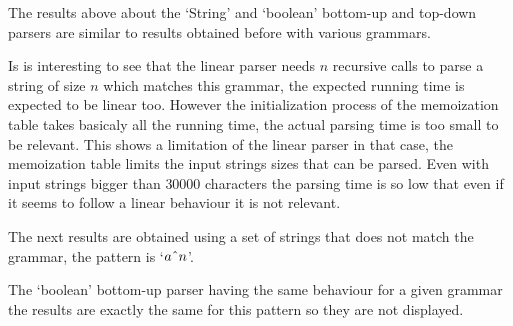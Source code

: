 The results above about the `String' and `boolean' bottom-up and top-down parsers are similar to results obtained before with various grammars.

Is is interesting to see that the linear parser needs $n$ recursive calls to parse a string of size $n$ which matches this grammar, the expected running time is expected to be linear too.
However the initialization process of the memoization table takes basicaly all the running time, the actual parsing time is too small to be relevant.
This shows a limitation of the linear parser in that case, the memoization table limits the input strings sizes that can be parsed.
Even with input strings bigger than $30000$ characters the parsing time is so low that even if it seems to follow a linear behaviour it is not relevant.

The next results are obtained using a set of strings that does not match the grammar, the pattern is `$a\string^ n$'.

The `boolean' bottom-up parser having the same behaviour for a given grammar the results are exactly the same for this pattern so they are not displayed.

